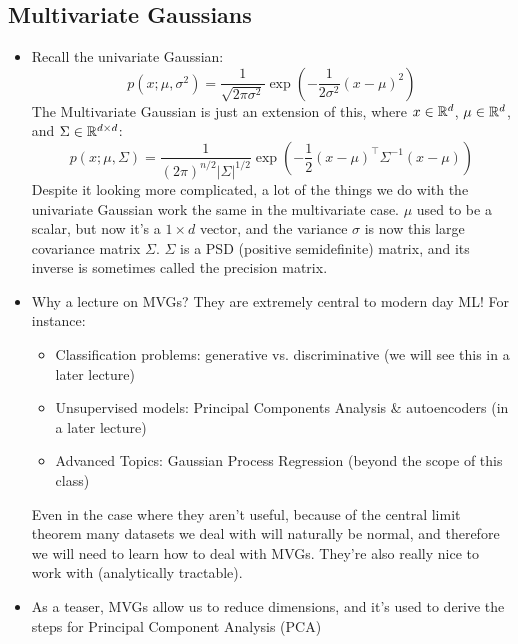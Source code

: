 \subsection{Multivariate Gaussians}
\begin{itemize}
	\item Recall the univariate Gaussian:
		\[
			p(x; \mu, \sigma^2) = \frac{1}{\sqrt{2\pi \sigma^2}}\exp\left(
			-\frac{1}{2\sigma^2}(x - \mu)^2 \right)
		\]
		The Multivariate Gaussian is just an extension of this, where \( x \in \mathbb R^{d}
		\), \( \mu \in \mathbb R^{d} \), and \( \Sigma \in \mathbb R^{d \times d} \):
		\[
			p(x; \mu, \Sigma) = \frac{1}{(2\pi)^{n / 2} |\Sigma|^{1 / 2}}\exp\left(
			-\frac{1}{2}(x - \mu)^{\top} \Sigma ^{-1} (x - \mu) \right)
		\]
		Despite it looking more complicated, a lot of the things we do with the
		univariate Gaussian work the same in the multivariate case. \( \mu \) used 
		to be a scalar, but now it's a \( 1 \times d \) vector, and the variance \(
		\sigma \) is now this large covariance matrix \( \Sigma \). \( \Sigma \) is a
		PSD (positive semidefinite) matrix, and its inverse is sometimes called the
		precision matrix. 
	\item Why a lecture on MVGs? They are extremely central to modern day ML!
		For instance:
		\begin{itemize}
			\item Classification problems: generative vs. discriminative (we will
				see this in a later lecture)
			\item Unsupervised models: Principal Components Analysis \& autoencoders
				(in a later lecture) 
			\item Advanced Topics: Gaussian Process Regression (beyond the scope of
				this class)
		\end{itemize}
		Even in the case where they aren't useful, because of the central limit
		theorem many datasets we deal with will naturally be normal, and therefore we
		will need to learn how to deal with MVGs. They're also really nice to work
		with (analytically tractable). 
	\item As a teaser, MVGs allow us to reduce dimensions, and it's used to derive the
		steps for Principal Component Analysis (PCA)
\end{itemize}
